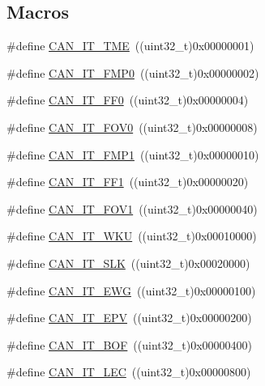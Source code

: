 \subsection*{Macros}
\begin{DoxyCompactItemize}
\item 
\#define \hyperlink{group___c_a_n__interrupts_ga619e36230fa2eb089a7c1936b5004eb9}{C\+A\+N\+\_\+\+I\+T\+\_\+\+T\+ME}~((uint32\+\_\+t)0x00000001)
\item 
\#define \hyperlink{group___c_a_n__interrupts_ga3fe6fbf53e9d692957e87ad329bcd362}{C\+A\+N\+\_\+\+I\+T\+\_\+\+F\+M\+P0}~((uint32\+\_\+t)0x00000002)
\item 
\#define \hyperlink{group___c_a_n__interrupts_gabf63043d9216de80ddc7ffe57b23ef67}{C\+A\+N\+\_\+\+I\+T\+\_\+\+F\+F0}~((uint32\+\_\+t)0x00000004)
\item 
\#define \hyperlink{group___c_a_n__interrupts_ga066a4317f95669e5b5931c9a759cf248}{C\+A\+N\+\_\+\+I\+T\+\_\+\+F\+O\+V0}~((uint32\+\_\+t)0x00000008)
\item 
\#define \hyperlink{group___c_a_n__interrupts_gaa0e101053fb203629e0e9a954213e71e}{C\+A\+N\+\_\+\+I\+T\+\_\+\+F\+M\+P1}~((uint32\+\_\+t)0x00000010)
\item 
\#define \hyperlink{group___c_a_n__interrupts_ga93b86d884ce0624b4b36c991fd75fc1c}{C\+A\+N\+\_\+\+I\+T\+\_\+\+F\+F1}~((uint32\+\_\+t)0x00000020)
\item 
\#define \hyperlink{group___c_a_n__interrupts_ga963301fdbede5f9a9665dc5b6210eaec}{C\+A\+N\+\_\+\+I\+T\+\_\+\+F\+O\+V1}~((uint32\+\_\+t)0x00000040)
\item 
\#define \hyperlink{group___c_a_n__interrupts_gac9c8767770d94de753dda9ad31f9af15}{C\+A\+N\+\_\+\+I\+T\+\_\+\+W\+KU}~((uint32\+\_\+t)0x00010000)
\item 
\#define \hyperlink{group___c_a_n__interrupts_ga639d4ab2777d9a2f8b7e67071b091059}{C\+A\+N\+\_\+\+I\+T\+\_\+\+S\+LK}~((uint32\+\_\+t)0x00020000)
\item 
\#define \hyperlink{group___c_a_n__interrupts_ga8a9f04ddf6ebe169d32b951a8ea135b3}{C\+A\+N\+\_\+\+I\+T\+\_\+\+E\+WG}~((uint32\+\_\+t)0x00000100)
\item 
\#define \hyperlink{group___c_a_n__interrupts_ga006b7b641d337a599ceac64b483e75dd}{C\+A\+N\+\_\+\+I\+T\+\_\+\+E\+PV}~((uint32\+\_\+t)0x00000200)
\item 
\#define \hyperlink{group___c_a_n__interrupts_gad63c39e6237aa07681a1f8ce2ff9e167}{C\+A\+N\+\_\+\+I\+T\+\_\+\+B\+OF}~((uint32\+\_\+t)0x00000400)
\item 
\#define \hyperlink{group___c_a_n__interrupts_gad670b6f001bf67f24e17d91ada50a61c}{C\+A\+N\+\_\+\+I\+T\+\_\+\+L\+EC}~((uint32\+\_\+t)0x00000800)

\end{DoxyCompactItemize}
